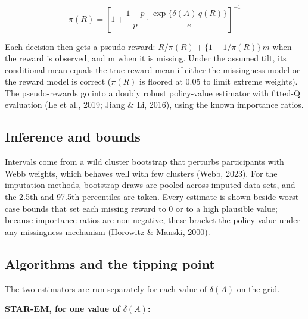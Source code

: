 \documentclass[12pt]{article}
\begin{document}
\begin{equation}\label{eq:pir}
\pi(R)=\left[1+\frac{1-p}{p}\cdot\frac{\exp\{\delta(A)\,q(R)\}}{e}\right]^{-1}
\end{equation}

Each decision then gets a pseudo-reward: $R/\pi(R)+\{1-1/\pi(R)\}\,m$ when the reward is observed, and m when it is missing. Under the assumed tilt, its conditional mean equals the true reward mean if either the missingness model or the reward model is correct ($\pi(R)$ is floored at 0.05 to limit extreme weights). The pseudo-rewards go into a doubly robust policy-value estimator with fitted-Q evaluation (Le et al., 2019; Jiang \& Li, 2016), using the known importance ratios.

\subsection{Inference and bounds}

Intervals come from a wild cluster bootstrap that perturbs participants with Webb weights, which behaves well with few clusters (Webb, 2023). For the imputation methods, bootstrap draws are pooled across imputed data sets, and the 2.5th and 97.5th percentiles are taken. Every estimate is shown beside worst-case bounds that set each missing reward to 0 or to a high plausible value; because importance ratios are non-negative, these bracket the policy value under any missingness mechanism (Horowitz \& Manski, 2000).

\subsection{Algorithms and the tipping point}

The two estimators are run separately for each value of $\delta(A)$ on the grid.

\textbf{STAR-EM, for one value of $\delta(A)$:}
\end{document}
